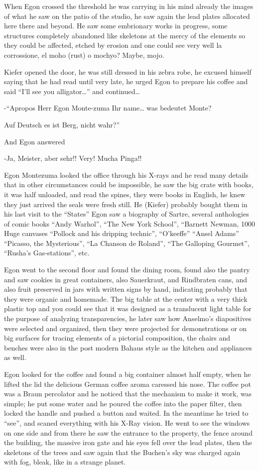 \documentclass[smalldemyvopaper,11pt,twoside,onecolumn,openright,extrafontsizes]{memoir}
\begin{document}
When Egon crossed the threshold he was carrying in his mind already the images of what he saw on the patio of the studio, he saw again the lead plates allocated here there and beyond. He saw some embrionary works in progress, some structures completely abandoned like skeletons at the mercy of the elements so they could be affected, etched by erosion and one could see very well la corrossione, el moho (rust) o mochyo? Maybe, mojo. 

Kiefer opened the door, he was still dressed in his zebra robe, he excused himself saying that he had read until very late, he urged Egon to prepare his coffee and said “I’ll see you alligator…” and continued… 

-“Apropos Herr Egon Monte-zuma Ihr name… was bedeutet Monte?

Auf Deutsch es ist Berg, nicht wahr?”

And Egon answered

-Ja, Meister, aber sehr!! Very! Mucha Pinga!!

Egon Montezuma looked the office through his X-rays and he read many details that in other circumstances could be impossible, he saw the big crate with books, it was half unloaded, and read the spines, they were books in English, he knew they just arrived the seals were fresh still. He (Kiefer) probably bought them in his last visit to the “States” Egon saw a biography of Sartre, several anthologies of comic books “Andy Warhol”, “The New York School”, “Barnett Newman, 1000 Huge canvases “Pollock and his dripping technic”, “O’keeffe” “Ansel Adams” “Picasso, the Mysterious”, “La Chanson de Roland”, “The Galloping Gourmet”, “Rusha’s Gas-stations”, etc.

Egon went to the second floor and found the dining room, found also the pantry and saw cookies in great containers, also Sauerkraut, and Rindbraten cans, and also fruit preserved in jars with written signs by hand, indicating probably that they were organic and homemade. The big table at the center with a very thick plastic top and you could see that it was designed as a translucent light table for the purpose of analyzing transparencies, he later saw how Anselmo’s diapositives were selected and organized, then they were projected for demonstrations or on big surfaces for tracing elements of a pictorial composition, the chairs and benches were also in the post modern Bahaus style as the kitchen and appliances as well.

Egon looked for the coffee and found a big container almost half empty, when he lifted the lid the delicious German coffee aroma caressed his nose.  The coffee pot was a Braun percolator and he noticed that the mechanism to make it work, was simple; he put some water and he poured the coffee into the paper filter, then locked the handle and pushed a button and waited. In the meantime he tried to “see”, and scaned everything with his X-Ray vision. He went to see the windows on one side and from there he saw the entrance to the property, the fence around the building, the massive iron gate and his eyes fell over the lead plates, then the skeletons of the trees and saw again that the Buchen’s sky was charged again with fog, bleak, like in a strange planet.
\end{document}
